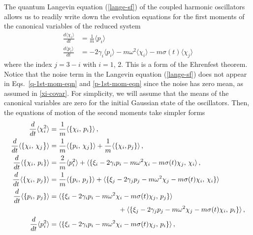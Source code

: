\documentclass[11pt,a4paper]{article}
\begin{document}
The quantum Langevin equation (\ref{lange-sf}) of the coupled harmonic oscillators allows us to readily write down the evolution equations for the first moments of the canonical variables of the reduced system~\cite{qle-ford}
\begin{align}
	\frac{d \langle \chi_{i} \rangle}{dt} &= \frac{1}{m} \langle p_{i} \rangle \label{q-1st-mom-eqn} \\
	\frac{d \langle p_{i} \rangle}{dt} &= -2\gamma_{i} \langle p_{i}\rangle - m\omega^2 \langle \chi_{i} \rangle - m\sigma(t) \langle \chi_{j}  \rangle \label{p-1st-mom-eqn}
\end{align}
where the index $j=3-i$ with $i=1$, 2. This is a form of the Ehrenfest theorem. Notice that the noise term in the Langevin equation (\ref{lange-sf}) does not appear in Eqs.~\eqref{q-1st-mom-eqn} and \eqref{p-1st-mom-eqn} since the noise has zero mean, as assumed in \eqref{xi-covar}. For simplicity, we will assume that the means of the canonical variables are zero for the initial Gaussian state of the oscillators. Then, the equations of motion of the second moments take simpler forms~\cite{qle-ford}
\begin{align}
	\frac{d}{dt}\langle\chi_{i}^2\rangle&= \frac{1}{m} \langle \{  \chi_{i},\,p_{i}  \} \rangle\,, \\ %
	\frac{d}{dt}\langle \{\chi_{i},\, \chi_{j}\bigr\} \rangle&= \frac{1}{m} \langle\{ p_{i},\, \chi_{j}\}\rangle+ \frac{1}{m} \langle\{\chi_{i}, p_{j}\}\rangle\,, \\%
	\frac{d}{dt}\langle\{ \chi_{i},\, p_{i}\}\rangle& =\frac{2}{m}\langle p_{i}^2 \rangle + \langle \{\xi_{i}-2\gamma_{i} p_{i} -m\omega^2 \chi_{i} -m\sigma(t)\chi_{j},\, \chi_{i}\rangle\,,    \\
	\frac{d }{dt}\langle\{ \chi_{i},\, p_{j}\}\rangle & = \frac{1}{m}\langle \{p_{i},\,p_{j}\}\rangle +\langle \{\xi_{j}-2\gamma_{j} p_{j} -m\omega^2 \chi_{j} -m\sigma(t)\chi_{i},\, \chi_{i}\} \rangle    \\
	\frac{d}{dt}\langle \{p_{i},\, p_{j}\}\rangle& =\langle \{\xi_{i}-2\gamma_{i} p_{i} -m\omega^2 \chi_{i} -m\sigma(t)\chi_{j},\, p_{j}\} \rangle\notag \\
		&\qquad\qquad\qquad\qquad\qquad+\langle \{\xi_{j}-2\gamma_{j} p_{j} -m\omega^2 \chi_{j} -m\sigma(t)\chi_{i},\, p_{i}\} \rangle\,,\\
	\frac{d}{dt}\langle p_{i}^2\rangle&= \langle \{\xi_{i}-2\gamma_{i} p_{i} -m\omega^2 \chi_{i} -m\sigma(t)\chi_{j},\, p_{i}\}\rangle\,, \label{E:ughdf}    
\end{align}
\end{document}
